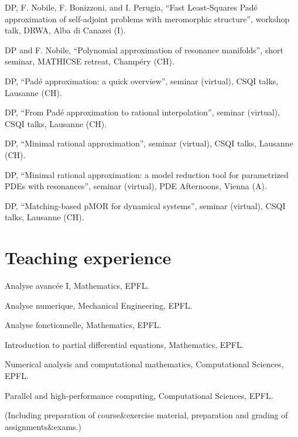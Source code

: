 \documentclass[11pt]{article} %
\begin{document}
\yearsminus DP, F. Nobile, F. Bonizzoni, and I. Perugia, ``Fast Least-Squares Pad\'e approximation of self-adjoint problems with meromorphic structure'', workshop talk, DRWA, Alba di Canazei (I).

DP and F. Nobile, ``Polynomial approximation of resonance manifolds'', short seminar, \mbox{MATHICSE} retreat, Champ\'ery (CH).

DP, ``Pad\'e approximation: a quick overview'', seminar (virtual), CSQI talks, Lausanne (CH).

DP, ``From Pad\'e approximation to rational interpolation'', seminar (virtual), CSQI talks, Lausanne (CH).

DP, ``Minimal rational approximation'', seminar (virtual), CSQI talks, Lausanne (CH).

\yearsminus DP, ``Minimal rational approximation: a model reduction tool for parametrized PDEs with resonances'', seminar (virtual), PDE Afternoons, Vienna (A).

DP, ``Matching-based pMOR for dynamical systems'', seminar (virtual), CSQI talks, Lausanne (CH).



\section*{Teaching experience}

\hspace{\parindent}Analyse avanc\'ee I, Mathematics, EPFL.

Analyse numerique, Mechanical Engineering, EPFL.

\yearsminus Analyse fonctionnelle, Mathematics, EPFL.

Introduction to partial differential equations, Mathematics, EPFL.

Numerical analysis and computational mathematics, Computational Sciences, EPFL.

Parallel and high-performance computing, Computational Sciences, EPFL.

\smallskip

\hspace{-\leftskip}(Including preparation of course\&exercise material, preparation and grading of assignments\&exams.)
\end{document}
